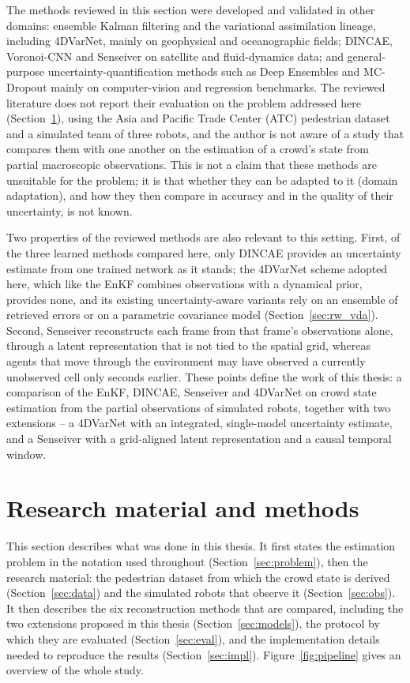 \documentclass[english, 12pt, a4paper, elec, utf8, a-2b, online]{aaltothesis}
\begin{document}
The methods reviewed in this section were developed and validated in
other domains: ensemble Kalman filtering and the variational
assimilation lineage, including 4DVarNet, mainly on geophysical and
oceanographic fields; DINCAE, Voronoi-CNN and Senseiver on satellite
and fluid-dynamics data; and general-purpose uncertainty-quantification
methods such as Deep Ensembles and MC-Dropout mainly on
computer-vision and regression benchmarks. The reviewed literature does not
report their evaluation on the problem addressed here
(Section~\ref{sec:methods}), using the Asia and Pacific Trade Center (ATC) pedestrian dataset and a
simulated team of three robots, and the author is not aware of a study
that compares them with one another on the estimation of a crowd's
state from partial macroscopic observations. This is not a claim that
these methods are unsuitable for the problem; it is that whether they
can be adapted to it (domain adaptation), and how they then compare in
accuracy and in the quality of their uncertainty, is not known.

Two properties of the reviewed methods are also relevant to this
setting. First, of the three learned methods compared here, only DINCAE provides an uncertainty
estimate from one trained network as it stands; the 4DVarNet scheme adopted
here, which like the EnKF combines observations with a dynamical prior,
provides none, and its existing uncertainty-aware variants rely on an ensemble
of retrieved errors or on a parametric covariance model
(Section~\ref{sec:rw_vda}). Second, Senseiver
reconstructs each frame from that frame's observations alone, through
a latent representation that is not tied to the spatial grid, whereas
agents that move through the environment may have observed a currently
unobserved cell only seconds earlier. These points define the work of
this thesis: a comparison of the EnKF, DINCAE, Senseiver and 4DVarNet
on crowd state estimation from the partial observations of simulated
robots, together with two extensions -- a 4DVarNet with an integrated,
single-model uncertainty estimate, and a Senseiver with a grid-aligned
latent representation and a causal temporal window.

\clearpage

\section{Research material and methods}
\label{sec:methods}

This section describes what was done in this thesis. It first states the
estimation problem in the notation used throughout
(Section~\ref{sec:problem}), then the research material: the pedestrian
dataset from which the crowd state is derived (Section~\ref{sec:data}) and the
simulated robots that observe it (Section~\ref{sec:obs}). It then describes the
six reconstruction methods that are compared, including the two extensions
proposed in this thesis (Section~\ref{sec:models}), the protocol by which they
are evaluated (Section~\ref{sec:eval}), and the implementation details needed to
reproduce the results (Section~\ref{sec:impl}). Figure~\ref{fig:pipeline} gives
an overview of the whole study.
\end{document}
